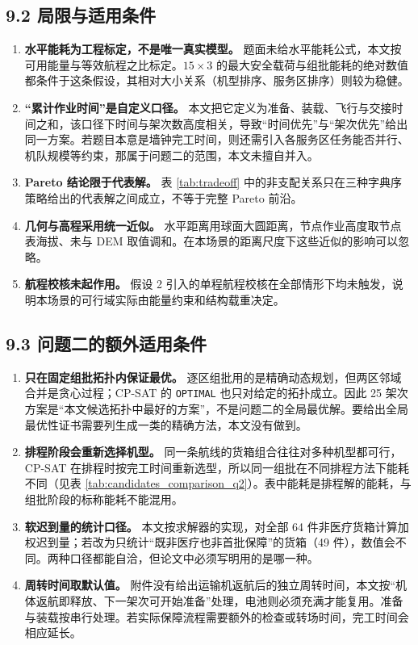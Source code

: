\documentclass[withoutpreface,bwprint]{format}
\begin{document}
\subsection{9.2 局限与适用条件}
\begin{enumerate}[leftmargin=*]
    \item \textbf{水平能耗为工程标定，不是唯一真实模型。} 题面未给水平能耗公式，本文按可用能量与等效航程之比标定。$15\times3$ 的最大安全载荷与组批能耗的绝对数值都条件于这条假设，其相对大小关系（机型排序、服务区排序）则较为稳健。
    \item \textbf{“累计作业时间”是自定义口径。} 本文把它定义为准备、装载、飞行与交接时间之和，该口径下时间与架次数高度相关，导致“时间优先”与“架次优先”给出同一方案。若题目本意是墙钟完工时间，则还需引入各服务区任务能否并行、机队规模等约束，那属于问题二的范围，本文未擅自并入。
    \item \textbf{Pareto 结论限于代表解。} 表 \ref{tab:tradeoff} 中的非支配关系只在三种字典序策略给出的代表解之间成立，不等于完整 Pareto 前沿。
    \item \textbf{几何与高程采用统一近似。} 水平距离用球面大圆距离，节点作业高度取节点表海拔、未与 DEM 取值调和。在本场景的距离尺度下这些近似的影响可以忽略。
    \item \textbf{航程校核未起作用。} 假设 2 引入的单程航程校核在全部情形下均未触发，说明本场景的可行域实际由能量约束和结构载重决定。
\end{enumerate}

\subsection{9.3 问题二的额外适用条件}
\begin{enumerate}[leftmargin=*]
    \item \textbf{只在固定组批拓扑内保证最优。} 逐区组批用的是精确动态规划，但两区邻域合并是贪心过程；CP-SAT 的 \texttt{OPTIMAL} 也只对给定的拓扑成立。因此 25 架次方案是“本文候选拓扑中最好的方案”，不是问题二的全局最优解。要给出全局最优性证书需要列生成一类的精确方法，本文没有做到。
    \item \textbf{排程阶段会重新选择机型。} 同一条航线的货箱组合往往对多种机型都可行，CP-SAT 在排程时按完工时间重新选型，所以同一组批在不同排程方法下能耗不同（见表 \ref{tab:candidates_comparison_q2}）。表中能耗是排程解的能耗，与组批阶段的标称能耗不能混用。
    \item \textbf{软迟到量的统计口径。} 本文按求解器的实现，对全部 64 件非医疗货箱计算加权迟到量；若改为只统计“既非医疗也非首批保障”的货箱（49 件），数值会不同。两种口径都能自洽，但论文中必须写明用的是哪一种。
    \item \textbf{周转时间取默认值。} 附件没有给出运输机返航后的独立周转时间，本文按“机体返航即释放、下一架次可开始准备”处理，电池则必须充满才能复用。准备与装载按串行处理。若实际保障流程需要额外的检查或转场时间，完工时间会相应延长。
\end{enumerate}
\end{document}
